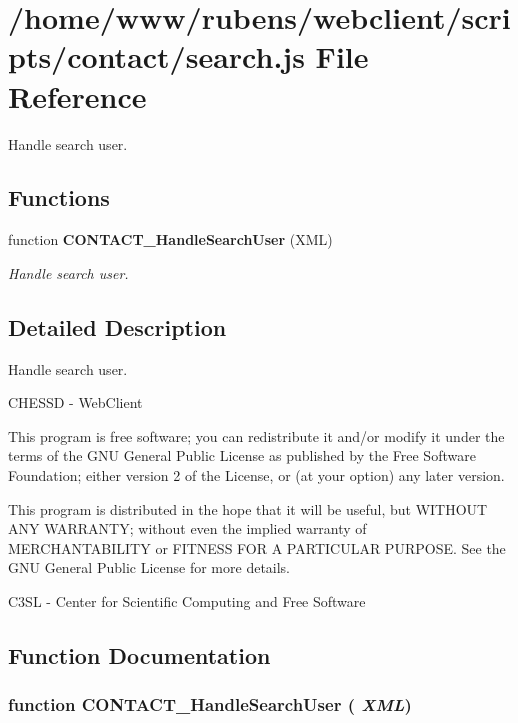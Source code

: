 \section{/home/www/rubens/webclient/scripts/contact/search.js File Reference}
\label{search_8js}
Handle search user. 

\subsection*{Functions}
\begin{CompactItemize}
\item 
function {\bf CONTACT\_\-HandleSearchUser} (XML)
\begin{CompactList}\small\item\em Handle search user. \item\end{CompactList}\end{CompactItemize}


\subsection{Detailed Description}
Handle search user. 

CHESSD - WebClient

This program is free software; you can redistribute it and/or modify it under the terms of the GNU General Public License as published by the Free Software Foundation; either version 2 of the License, or (at your option) any later version.

This program is distributed in the hope that it will be useful, but WITHOUT ANY WARRANTY; without even the implied warranty of MERCHANTABILITY or FITNESS FOR A PARTICULAR PURPOSE. See the GNU General Public License for more details.

C3SL - Center for Scientific Computing and Free Software 

\subsection{Function Documentation}
\subsubsection[CONTACT\_\-HandleSearchUser]{\setlength{\rightskip}{0pt plus 5cm}function CONTACT\_\-HandleSearchUser ( {\em XML})}\label{search_8js_43d314141fd72107038df2203e912d3a}


